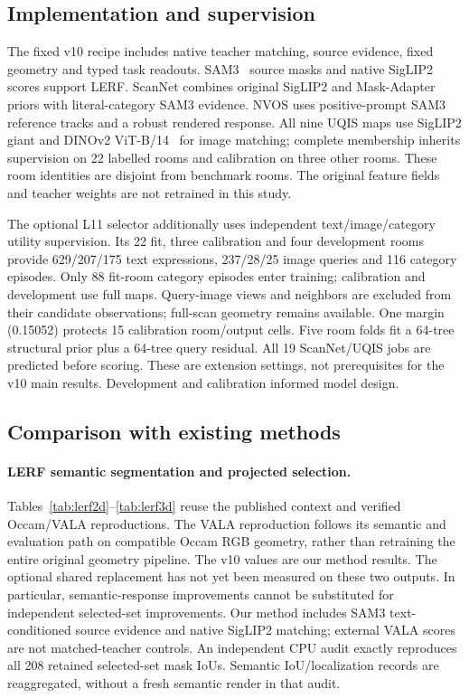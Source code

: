 \subsection{Implementation and supervision}
The fixed v10 recipe includes native teacher matching, source evidence, fixed
geometry and typed task readouts. SAM3~\cite{sam3} source masks and native
SigLIP2~\cite{siglip2} scores support LERF. ScanNet combines original SigLIP2
and Mask-Adapter~\cite{maskadapter} priors with
literal-category SAM3 evidence. NVOS uses positive-prompt SAM3 reference tracks
and a robust rendered response. All nine UQIS maps use SigLIP2 giant and
DINOv2 ViT-B/14~\cite{dinov2} for image matching;
complete membership inherits supervision on 22 labelled rooms and calibration
on three other rooms. These room identities are disjoint from benchmark rooms.
The original feature fields and teacher weights are not retrained in this study.

The optional L11 selector additionally uses independent text/image/category
utility supervision. Its 22 fit, three calibration and four development rooms
provide 629/207/175 text expressions, 237/28/25 image queries and 116 category
episodes. Only 88 fit-room category episodes enter training; calibration and
development use full maps. Query-image views and neighbors are excluded from
their candidate observations; full-scan geometry remains available. One margin
(0.15052) protects 15 calibration room/output cells. Five room folds fit a
64-tree structural prior plus a 64-tree query residual. All 19 ScanNet/UQIS jobs
are predicted before scoring. These are extension settings, not prerequisites
for the v10 main results. Development and calibration informed model design.

\subsection{Comparison with existing methods}
\paragraph{LERF semantic segmentation and projected selection.}
Tables~\ref{tab:lerf2d}--\ref{tab:lerf3d} reuse the published context and verified
Occam/VALA reproductions. The VALA reproduction follows its semantic and
evaluation path on compatible Occam RGB geometry, rather than retraining the
entire original geometry pipeline. The v10 values are our method results. The optional shared replacement has
not yet been measured on these two outputs. In particular, semantic-response improvements cannot be substituted
for independent selected-set improvements.
Our method includes SAM3 text-conditioned source evidence and native SigLIP2
matching; external VALA scores are not matched-teacher controls. An independent
CPU audit exactly reproduces all 208 retained selected-set mask IoUs. Semantic
IoU/localization records are reaggregated, without a fresh semantic render in
that audit.

